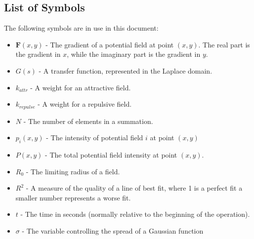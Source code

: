 \subsection*{List of Symbols}

The following symbols are in use in this document:

\begin{itemize}
  \item $\boldsymbol{F}(x,y)$ - The gradient of a potential field at point $\left(x,y\right)$.  The real part is the gradient in $x$, while the imaginary part is the gradient in $y$.
  \item $G(s)$ - A transfer function, represented in the Laplace domain.
  \item $k_{attr}$ - A weight for an attractive field.
  \item $k_{repulse}$ - A weight for a repulsive field.
  \item $N$ - The number of elements in a summation.
  \item $p_i(x,y)$ - The intensity of potential field $i$ at point $\left(x,y\right)$
  \item $P(x,y)$ - The total potential field intensity at point $\left(x,y\right)$.
  \item $R_0$ - The limiting radius of a field.
  \item $R^2$ - A measure of the quality of a line of best fit, where 1 is a perfect fit a smaller number represents a worse fit.
  \item $t$ - The time in seconds (normally relative to the beginning of the operation).
  \item $\sigma$ - The variable controlling the spread of a Gaussian function
\end{itemize}

\cleardoublepage

